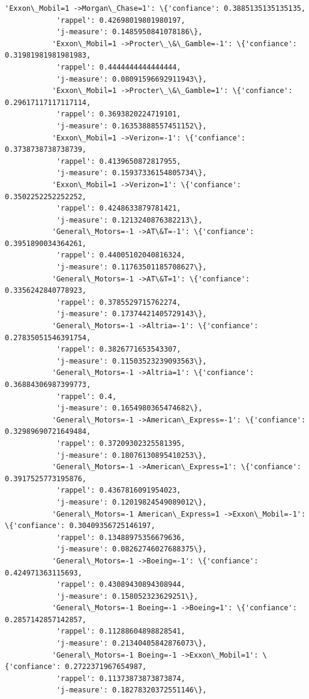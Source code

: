 \documentclass[11pt]{article}
\begin{document}
\begin{Verbatim}[commandchars=\\\{\}]
           'Exxon\_Mobil=1 ->Morgan\_Chase=1': \{'confiance': 0.3885135135135135,
            'rappel': 0.42698019801980197,
            'j-measure': 0.1485950841078186\},
           'Exxon\_Mobil=1 ->Procter\_\&\_Gamble=-1': \{'confiance': 0.31981981981981983,
            'rappel': 0.4444444444444444,
            'j-measure': 0.08091596692911943\},
           'Exxon\_Mobil=1 ->Procter\_\&\_Gamble=1': \{'confiance': 0.29617117117117114,
            'rappel': 0.3693820224719101,
            'j-measure': 0.16353888557451152\},
           'Exxon\_Mobil=1 ->Verizon=-1': \{'confiance': 0.3738738738738739,
            'rappel': 0.4139650872817955,
            'j-measure': 0.15937336154805734\},
           'Exxon\_Mobil=1 ->Verizon=1': \{'confiance': 0.3502252252252252,
            'rappel': 0.4248633879781421,
            'j-measure': 0.1213240876382213\},
           'General\_Motors=-1 ->AT\&T=-1': \{'confiance': 0.3951890034364261,
            'rappel': 0.44005102040816324,
            'j-measure': 0.11763501185708627\},
           'General\_Motors=-1 ->AT\&T=1': \{'confiance': 0.3356242840778923,
            'rappel': 0.3785529715762274,
            'j-measure': 0.17374421405729143\},
           'General\_Motors=-1 ->Altria=-1': \{'confiance': 0.27835051546391754,
            'rappel': 0.3826771653543307,
            'j-measure': 0.11503523239093563\},
           'General\_Motors=-1 ->Altria=1': \{'confiance': 0.36884306987399773,
            'rappel': 0.4,
            'j-measure': 0.1654980365474682\},
           'General\_Motors=-1 ->American\_Express=-1': \{'confiance': 0.32989690721649484,
            'rappel': 0.37209302325581395,
            'j-measure': 0.18076130895410253\},
           'General\_Motors=-1 ->American\_Express=1': \{'confiance': 0.3917525773195876,
            'rappel': 0.4367816091954023,
            'j-measure': 0.12019824549089012\},
           'General\_Motors=-1 American\_Express=1 ->Exxon\_Mobil=-1': \{'confiance': 0.30409356725146197,
            'rappel': 0.13488975356679636,
            'j-measure': 0.08262746027688375\},
           'General\_Motors=-1 ->Boeing=-1': \{'confiance': 0.424971363115693,
            'rappel': 0.43089430894308944,
            'j-measure': 0.158052323629251\},
           'General\_Motors=-1 Boeing=-1 ->Boeing=1': \{'confiance': 0.2857142857142857,
            'rappel': 0.11288604898828541,
            'j-measure': 0.21340405842876073\},
           'General\_Motors=-1 Boeing=-1 ->Exxon\_Mobil=1': \{'confiance': 0.2722371967654987,
            'rappel': 0.11373873873873874,
            'j-measure': 0.18278320372551146\},

\end{Verbatim}
\end{document}
